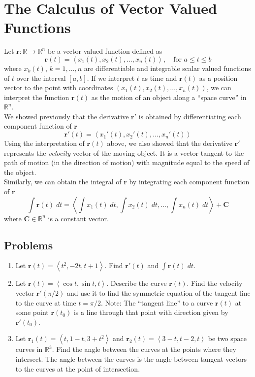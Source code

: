 \documentclass[12pt,letterpaper,fleqn]{article}
\newcommand{\lv}[1]{\ensuremath{\left\langle #1 \right\rangle}}
\renewcommand{\vec}[1]{\ensuremath{\pmb{#1}}}
\renewcommand{\v}[1]{\ensuremath{\vec{#1}}}
\begin{document}
\section*{The Calculus of Vector Valued Functions}
Let $\v{r}: \mathbb{R}\to\mathbb{R}^n$ be a vector valued function defined as
\begin{equation*}
 \v{r}(t) = \lv{x_1(t), x_2(t),\ldots, x_n(t)},\quad\text{for } a\leq t\leq b
\end{equation*}
where $x_k(t)$, $k = 1,\ldots,n$ are differentiable and integrable scalar valued functions of $t$ over the interval $[a, b]$. If we interpret $t$ as time and $\v{r}(t)$ as a position vector to the point with coordinates $(x_1(t), x_2(t),\ldots,x_n(t))$, we can interpret the function $\v{r}(t)$ as the motion of an object along a ``space curve'' in $\mathbb{R}^n$.\\[1.5ex] We showed previously that the derivative $\v{r}'$ is obtained by differentiating each component function of $\v{r}$
\begin{equation*}
 \v{r}'(t) = \lv{x_1'(t), x_2'(t),\ldots, x_n'(t)}
\end{equation*}
Using the interpretation of $\v{r}(t)$ above, we also showed that the derivative $\v{r}'$ represents the \emph{velocity} vector of the moving object. It is a vector tangent to the path of motion (in the direction of motion) with magnitude equal to the speed of the object.\\[1.5ex]
Similarly, we can obtain the integral of $\v{r}$ by integrating each component function of $\v{r}$
\begin{equation*}
 \int\v{r}(t)\;dt = \lv{\int x_1(t)\;dt, \int x_2(t)\;dt,\ldots, \int x_n(t)\;dt} + \v{C}
\end{equation*}
where $\v{C}\in\mathbb{R}^n$ is a constant vector.
\subsection*{Problems}
\begin{enumerate}
 \item Let $\v{r}(t) = \lv{t^2, -2t, t+1}$. Find $\v{r}'(t)$ and $\int\v{r}(t)\;dt$.
 \item Let $\v{r}(t) = \lv{\cos t, \sin t, t}$. Describe the curve $\v{r}(t)$. Find the velocity vector $\v{r}'(\pi/2)$ and use it to find the symmetric equation of the tangent line to the curve at time $t = \pi/2$. Note: The ``tangent line'' to a curve $\v{r}(t)$ at some point $\v{r}(t_0)$ is a line through that point with direction given by $\v{r}'(t_0)$.
 \item Let $\v{r}_1(t) = \lv{t, 1 - t, 3 + t^2}$ and $\v{r}_2(t) = \lv{3 - t, t - 2, t}$ be two space curves in $\mathbb{R}^3$. Find the angle between the curves at the points where they intersect. The angle between the curves is the angle between tangent vectors to the curves at the point of intersection.
\end{enumerate}
\end{document}
